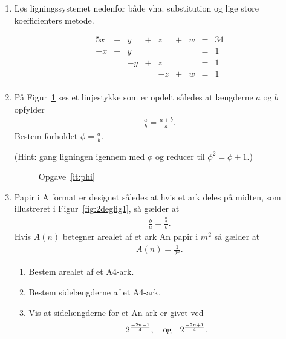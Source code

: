 \begin{enumerate}
\item Løs ligningssystemet nedenfor både vha. substitution og lige store koefficienters metode.

\begin{alignat*}{5}
x & {}+{} &  y & {}+{} & z &{}+{}&w & {}={} & 34 \\
-x & {}+{} &  y & {}{} & &{}{}&  & {}={} & 1 \\
&  &  -y & {}+{} & z & & & {}={} & 1 \\
&  &   &&-z &{}+{}& w & {}={} & 1 \\
\end{alignat*}

\item \label{it:phi} På Figur~\ref{fig:phi} ses et linjestykke som er opdelt således at længderne $a$ og $b$ opfylder
\begin{align*}
\frac{a}{b}=\frac{a+b}{a}.
\end{align*}
Bestem forholdet $\phi=\frac{a}{b}$. 

(Hint: gang ligningen igennem med $\phi$ og reducer til $\phi^2=\phi+1$.)

\begin{figure}
	\centering
	\caption{Opgave~\ref{it:phi}}
	\label{fig:phi}
\end{figure}

\item Papir i A format er designet således at hvis et ark deles på midten, som illustreret i Figur~\ref{fig:2deglig1}, så gælder at
\begin{align*}
\frac{b}{a}=\frac{\frac{a}{2}}{b}.
\end{align*}
Hvis $A(n)$ betegner arealet af et ark An papir i $m^2$ så gælder at
\begin{align*}
A(n)= \frac{1}{2^n}.
\end{align*}
\begin{enumerate}
	\item Bestem arealet af et A4-ark.
	\item Bestem sidelængderne af et A4-ark.
	\item Vis at sidelængderne for et An ark er givet ved
	\begin{align*}
	2^{\frac{-2n-1}{4}},\quad \textup{og}\quad 2^{ \frac{-2n+1}{4}}.
	\end{align*}
\end{enumerate}


\end{enumerate}
